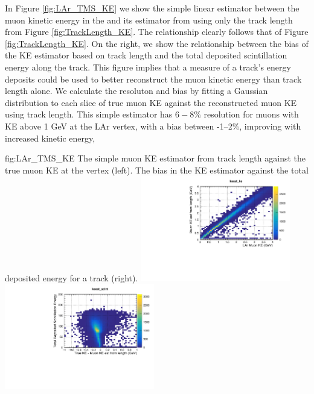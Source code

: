 In Figure \ref{fig:LAr_TMS_KE} we show the simple linear estimator between the muon kinetic energy in the  and its estimator from using only the track length from Figure \ref{fig:TrackLength_KE}. The relationship clearly follows that of Figure \ref{fig:TrackLength_KE}. On the right, we show the relationship between the bias of the KE estimator based on track length and the total deposited scintillation energy along the track. This figure implies that a measure of a track's energy deposits could be used to better reconstruct the muon kinetic energy than track length alone. We calculate the resoluton and bias by fitting a Gaussian distribution to each slice of true muon KE against the reconstructed muon KE using track length. This simple estimator has $6-8\%$ resolution for muons with KE above 1 GeV at the LAr vertex, with a bias between -1--2\%, improving with increased kinetic energy, 
\begin{dunefigure}{fig:LAr_TMS_KE}
{The simple muon KE estimator from track length against the true muon KE at the  vertex (left). The bias in the KE estimator against the total deposited energy for a track (right).}
\includegraphics[width=0.49\textwidth, clip, trim={0mm 0mm 0mm 10mm}]{graphics/tms/Simulation/KE_est/muonKEest_muonKE.pdf}
\includegraphics[width=0.49\textwidth, clip, trim={0mm 0mm 0mm 10mm}]{graphics/tms/Simulation/KE_est/bias_energydeposit.pdf}
\end{dunefigure}

